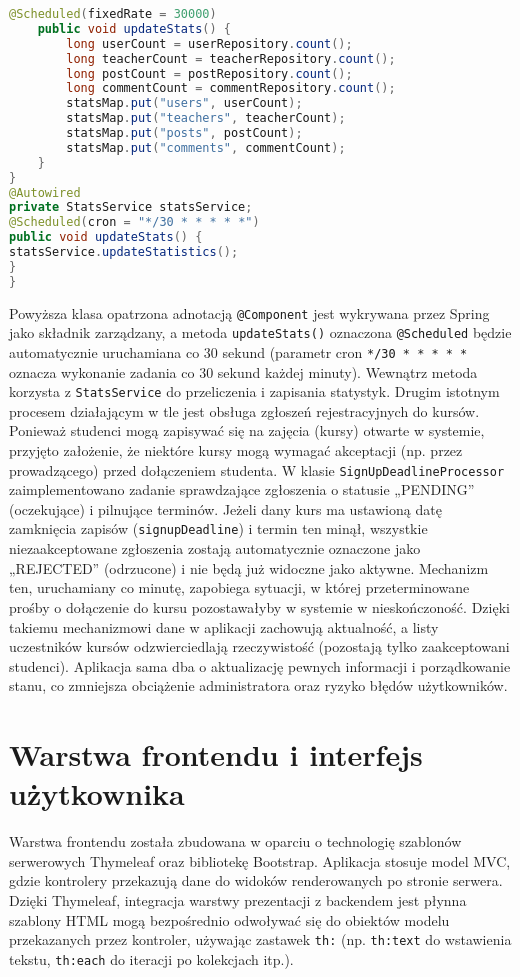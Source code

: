 \begin{lstlisting}[language=Java,
  caption={kod aktualizowania statystyk. Źródło: opracowanie własne},
  label={lst:statisticUpdater},
  captionpos=b]
    @Scheduled(fixedRate = 30000)
    public void updateStats() {
        long userCount = userRepository.count();
        long teacherCount = teacherRepository.count();
        long postCount = postRepository.count();
        long commentCount = commentRepository.count();
        statsMap.put("users", userCount);
        statsMap.put("teachers", teacherCount);
        statsMap.put("posts", postCount);
        statsMap.put("comments", commentCount);
    }
}
@Autowired
private StatsService statsService;
@Scheduled(cron = "*/30 * * * * *")
public void updateStats() {
statsService.updateStatistics();
}
}
\end{lstlisting} Powyższa klasa opatrzona adnotacją \texttt{@Component} jest wykrywana przez Spring jako składnik zarządzany, a metoda \texttt{updateStats()} oznaczona \texttt{@Scheduled} będzie automatycznie uruchamiana co 30 sekund (parametr cron \texttt{*/30 * * * * *} oznacza wykonanie zadania co 30 sekund każdej minuty). Wewnątrz metoda korzysta z \texttt{StatsService} do przeliczenia i zapisania statystyk. Drugim istotnym procesem działającym w tle jest obsługa zgłoszeń rejestracyjnych do kursów. Ponieważ studenci mogą zapisywać się na zajęcia (kursy) otwarte w systemie, przyjęto założenie, że niektóre kursy mogą wymagać akceptacji (np. przez prowadzącego) przed dołączeniem studenta. W klasie \texttt{SignUpDeadlineProcessor} zaimplementowano zadanie sprawdzające zgłoszenia o statusie „PENDING” (oczekujące) i pilnujące terminów. Jeżeli dany kurs ma ustawioną datę zamknięcia zapisów (\texttt{signupDeadline}) i termin ten minął, wszystkie niezaakceptowane zgłoszenia zostają automatycznie oznaczone jako „REJECTED” (odrzucone) i nie będą już widoczne jako aktywne. Mechanizm ten, uruchamiany co minutę, zapobiega sytuacji, w której przeterminowane prośby o dołączenie do kursu pozostawałyby w systemie w nieskończoność. Dzięki takiemu mechanizmowi dane w aplikacji zachowują aktualność, a listy uczestników kursów odzwierciedlają rzeczywistość (pozostają tylko zaakceptowani studenci). Aplikacja sama dba o aktualizację pewnych informacji i porządkowanie stanu, co zmniejsza obciążenie administratora oraz ryzyko błędów użytkowników. \section{Warstwa frontendu i interfejs użytkownika} Warstwa frontendu została zbudowana w oparciu o technologię szablonów serwerowych Thymeleaf oraz bibliotekę Bootstrap. Aplikacja stosuje model MVC, gdzie kontrolery przekazują dane do widoków renderowanych po stronie serwera. Dzięki Thymeleaf, integracja warstwy prezentacji z backendem jest płynna  szablony HTML mogą bezpośrednio odwoływać się do obiektów modelu przekazanych przez kontroler, używając zastawek \texttt{th:} (np. \texttt{th:text} do wstawienia tekstu, \texttt{th:each} do iteracji po kolekcjach itp.).



